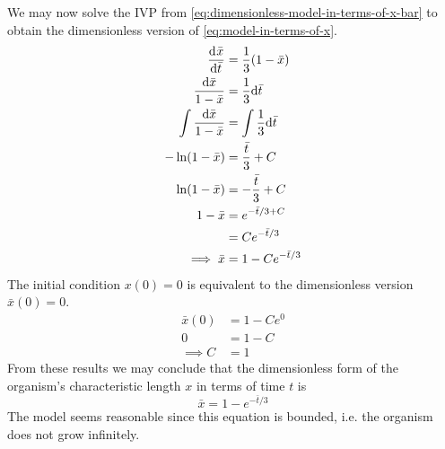 \documentclass[12pt]{article}
\begin{document}
We may now solve the IVP from \cref{eq:dimensionless-model-in-terms-of-x-bar} to
obtain the dimensionless version of \cref{eq:model-in-terms-of-x}.
\begin{equation*}
  \begin{aligned}
    \frac{\mathrm{d}^{} {\bar{x}}}{\mathrm{d}{\bar{t}}^{}} &= \frac{1}{3}(1-\bar{x}) \\
    \frac{\mathrm{d}{\bar{x}}}{1-\bar{x}} &= \frac{1}{3} \mathrm{d}{\bar{t}} \\
    \int \frac{\mathrm{d}{\bar{x}}}{1-\bar{x}} &= \int \frac{1}{3} \mathrm{d}{\bar{t}} \\
    -\ln (1-\bar{x}) &= \frac{\bar{t}}{3} + C \\
    \ln (1-\bar{x}) &= -\frac{\bar{t}}{3} + C \\
    1-\bar{x} &= e^{-\bar{t}/3+C} \\
    &= Ce^{-\bar{t}/3} \\
    \implies \bar{x} &= 1-Ce^{-\bar{t}/3}
  \end{aligned}
\end{equation*}
The initial condition $x(0)=0$ is equivalent to the dimensionless version
$\bar{x}(0)=0$.
\begin{equation*}
  \begin{aligned}
    \bar{x}(0) &= 1-Ce^{0} \\
    0 &= 1-C \\
    \implies C &= 1
  \end{aligned}
\end{equation*}
From these results we may conclude that the dimensionless form of the organism's
characteristic length $x$ in terms of time $t$ is
\begin{equation*} \boxed{
    \bar{x} = 1-e^{-\bar{t}/3}
  }
\end{equation*}
The model seems reasonable since this equation is bounded, i.e. the organism
does not grow infinitely.


\end{document}
